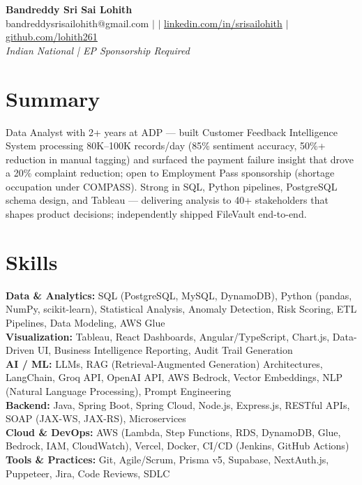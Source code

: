 \documentclass[10pt,letterpaper]{article}
\newcommand{\skillrow}[2]{\textbf{#1:} #2 \\[1pt]}
\begin{document}
\begin{center}
  {\Huge\bfseries Bandreddy Sri Sai Lohith}\\[3pt]
  \small bandreddysrisailohith@gmail.com $\vert$ $\vert$\; \href{https://linkedin.com/in/srisailohith}{linkedin.com/in/srisailohith} $\vert$\; \href{https://github.com/lohith261}{github.com/lohith261} \\[2pt]
  \small\textit{Indian National | EP Sponsorship Required}
\end{center}

\section{Summary}

Data Analyst with 2+ years at ADP --- built Customer Feedback Intelligence System processing 80K--100K records/day (85\% sentiment accuracy, 50\%+ reduction in manual tagging) and surfaced the payment failure insight that drove a 20\% complaint reduction; open to Employment Pass sponsorship (shortage occupation under COMPASS).
      Strong in SQL, Python pipelines, PostgreSQL schema design, and Tableau --- delivering analysis to 40+ stakeholders that shapes product decisions; independently shipped FileVault end-to-end.

\section{Skills}

\skillrow{Data \& Analytics}{SQL (PostgreSQL, MySQL, DynamoDB), Python (pandas, NumPy, scikit-learn), Statistical Analysis, Anomaly Detection, Risk Scoring, ETL Pipelines, Data Modeling, AWS Glue}
\skillrow{Visualization}{Tableau, React Dashboards, Angular/TypeScript, Chart.js, Data-Driven UI, Business Intelligence Reporting, Audit Trail Generation}
\skillrow{AI / ML}{LLMs, RAG (Retrieval-Augmented Generation) Architectures, LangChain, Groq API, OpenAI API, AWS Bedrock, Vector Embeddings, NLP (Natural Language Processing), Prompt Engineering}
\skillrow{Backend}{Java, Spring Boot, Spring Cloud, Node.js, Express.js, RESTful APIs, SOAP (JAX-WS, JAX-RS), Microservices}
\skillrow{Cloud \& DevOps}{AWS (Lambda, Step Functions, RDS, DynamoDB, Glue, Bedrock, IAM, CloudWatch), Vercel, Docker, CI/CD (Jenkins, GitHub Actions)}
\skillrow{Tools \& Practices}{Git, Agile/Scrum, Prisma v5, Supabase, NextAuth.js, Puppeteer, Jira, Code Reviews, SDLC}
\end{document}
